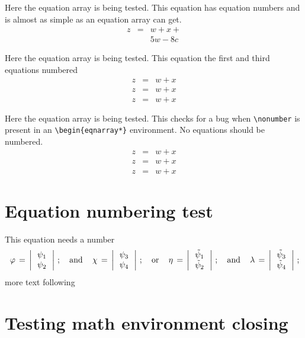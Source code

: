 \documentclass{article}
\begin{document}
Here the equation array is being tested.  This equation has equation numbers
and is almost as simple as an equation array can get.
\begin{eqnarray}
z & = & w + x + \\
  &   & 5w - 8c 
\end{eqnarray}

Here the equation array is being tested.  This equation the first and third equations numbered
\begin{eqnarray}
z & = & w + x  \\
z & = & w + x \nonumber\\
z & = & w + x  
\end{eqnarray}

Here the equation array is being tested.  This checks for a bug when 
\verb#\nonumber# is present in an \verb#\begin{eqnarray*}# environment.  
No equations should be numbered.
\begin{eqnarray*}
z & = & w + x  \\
z & = & w + x \nonumber\\
z & = & w + x  
\end{eqnarray*}

\section{Equation numbering test}
This equation needs a number 
\begin{equation}\label{ab3}
\,\varphi\,=\,\left|\,
\begin{array}{c}
\psi_1 \\
\psi_2
\end{array}\,\right|\,; \quad {\rm and} \quad
\,\chi\,=\,\left|\,
\begin{array}{c}
\psi_3 \\
\psi_4
\end{array}\,\right|\,; \quad {\rm or} \quad
\,\eta\,=\,\left|\,
\begin{array}{c}
\tilde{\psi}_1 \\
\tilde{\psi}_2
\end{array}\,\right|\,; \quad {\rm and} \quad
\,\lambda\,=\,\left|\,
\begin{array}{c}
\tilde{\psi}_3 \\
\tilde{\psi}_4
\end{array}\,\right|\,;
\end{equation}
more text following

\section{Testing math environment closing}
\end{document}
